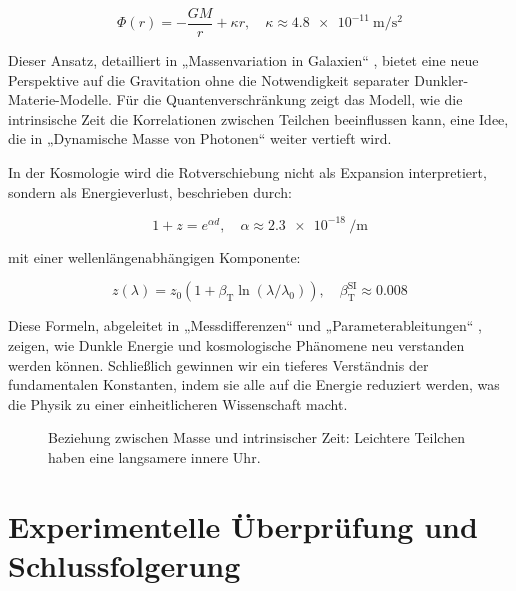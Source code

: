 \documentclass[a4paper,12pt]{article}
\newcommand{\Tfield}{T(x)}
\newcommand{\betaT}{\beta_{\text{T}}}
\begin{document}
	\begin{equation}
		\Phi(r) = -\frac{G M}{r} + \kappa r, \quad \kappa \approx \SI{4.8e-11}{\meter\per\second\squared}
	\end{equation}
	
	Dieser Ansatz, detailliert in „Massenvariation in Galaxien“ \cite{pascher_galaxies_2025}, bietet eine neue Perspektive auf die Gravitation ohne die Notwendigkeit separater Dunkler-Materie-Modelle. Für die Quantenverschränkung zeigt das Modell, wie die intrinsische Zeit die Korrelationen zwischen Teilchen beeinflussen kann, eine Idee, die in „Dynamische Masse von Photonen“ \cite{pascher_photons_2025} weiter vertieft wird.
	
	In der Kosmologie wird die Rotverschiebung nicht als Expansion interpretiert, sondern als Energieverlust, beschrieben durch:
	
	\begin{equation}
		1 + z = e^{\alpha d}, \quad \alpha \approx \SI{2.3e-18}{\per\meter}
	\end{equation}
	
	mit einer wellenlängenabhängigen Komponente:
	
	\begin{equation}
		z(\lambda) = z_0 (1 + \betaT \ln(\lambda/\lambda_0)), \quad \betaT^{\text{SI}} \approx 0.008
	\end{equation}
	
	Diese Formeln, abgeleitet in „Messdifferenzen“ \cite{pascher_messdifferenzen_2025} und „Parameterableitungen“ \cite{pascher_params_2025}, zeigen, wie Dunkle Energie und kosmologische Phänomene neu verstanden werden können. Schließlich gewinnen wir ein tieferes Verständnis der fundamentalen Konstanten, indem sie alle auf die Energie reduziert werden, was die Physik zu einer einheitlicheren Wissenschaft macht.
	
	\begin{figure}[h]
		\centering
		\caption{Beziehung zwischen Masse und intrinsischer Zeit: Leichtere Teilchen haben eine langsamere innere Uhr.}
	\end{figure}
	
	\section{Experimentelle Überprüfung und Schlussfolgerung}
	
\end{document}
